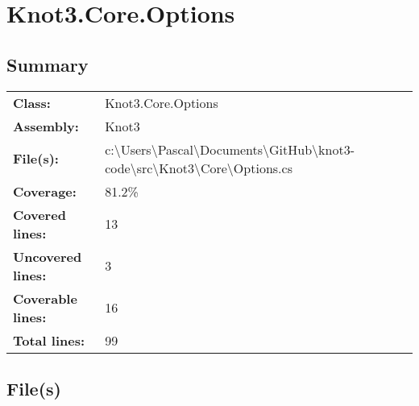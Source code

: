 \documentclass[a4paper,10pt]{article}
\begin{document}
\section{Knot3.Core.Options}
\subsection{Summary}
\begin{longtable}[l]{ll}
\textbf{Class:} & Knot3.Core.Options\\
\textbf{Assembly:} & Knot3\\
\textbf{File(s):} & \begin{minipage}[t]{12cm}{c:\textbackslash Users\textbackslash Pascal\textbackslash Documents\textbackslash GitHub\textbackslash knot3-code\textbackslash src\textbackslash Knot3\textbackslash Core\textbackslash Options.cs}\end{minipage} \\
\textbf{Coverage:} & 81.2\%\\
\textbf{Covered lines:} & 13\\
\textbf{Uncovered lines:} & 3\\
\textbf{Coverable lines:} & 16\\
\textbf{Total lines:} & 99\\
\end{longtable}
\subsection{File(s)}
\end{document}

